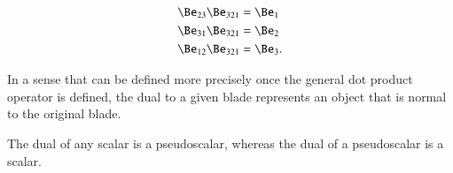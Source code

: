 \begin{dmath}\label{eqn:definitions:400}
\begin{aligned}
\Be_{23} \Be_{321} &= \Be_1 \\
\Be_{31} \Be_{321} &= \Be_2 \\
\Be_{12} \Be_{321} &= \Be_3.
\end{aligned}
\end{dmath}

In a sense that can be defined more precisely once the general dot product operator is defined, the dual to a given blade represents an object that is normal to the original blade.

The dual of any scalar is a pseudoscalar, whereas the dual of a pseudoscalar is a scalar.

